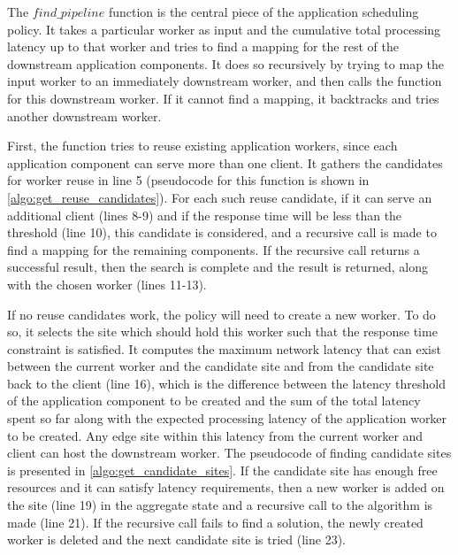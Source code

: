 The $find\_pipeline$ function is the central piece of the application scheduling policy. It takes a particular worker as input and the cumulative total processing latency up to that worker and tries to find a mapping for the rest of the downstream application components. It does so recursively by trying to map the input worker to an immediately downstream worker, and then calls the function for this downstream worker. If it cannot find a mapping, it backtracks and tries another downstream worker.
\par First, the function tries to reuse existing application workers, since each application component can serve more than one client. It gathers the candidates for worker reuse in line 5 (pseudocode for this function is shown in \cref{algo:get_reuse_candidates}). For each such reuse candidate, if it can serve an additional client (lines 8-9) and if the response time will be less than the threshold (line 10), this candidate is considered, and a recursive call is made to find a mapping for the remaining components. If the recursive call returns a successful result, then the search is complete and the result is returned, along with the chosen worker (lines 11-13).
\par If no reuse candidates work, the policy will need to create a new worker. To do so, it selects the site which should hold this worker such that the response time constraint is satisfied. It computes the maximum network latency that can exist between the current worker and the candidate site and from the candidate site back to the client (line 16), which is the difference between the latency threshold of the application component to be created and the sum of the total latency spent so far along with the expected processing latency of the application worker to be created. Any edge site within this latency from the current worker and client can host the downstream worker. The pseudocode of finding candidate sites is presented in \cref{algo:get_candidate_sites}. If the candidate site has enough free resources and it can satisfy latency requirements, then a new worker is added on the site (line 19) in the aggregate state and a recursive call to the algorithm is made (line 21). If the recursive call fails to find a solution, the newly created worker is deleted and the next candidate site is tried (line 23).

